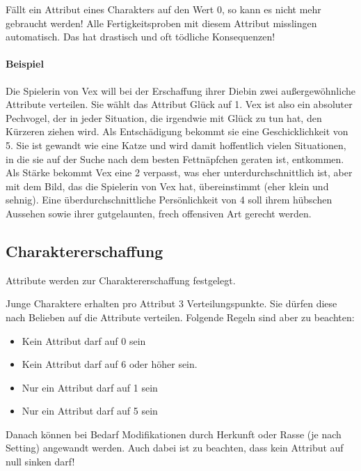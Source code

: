 \documentclass{article}
\begin{document}
Fällt ein Attribut eines Charakters auf den Wert 0, so kann es nicht mehr gebraucht werden! Alle Fertigkeitsproben
mit diesem Attribut misslingen automatisch. Das hat drastisch und oft tödliche Konsequenzen!

\paragraph{Beispiel}

Die Spielerin von Vex will bei der Erschaffung ihrer Diebin zwei außergewöhnliche Attribute verteilen. Sie wählt das
Attribut Glück auf 1. Vex ist also ein absoluter Pechvogel, der in jeder Situation, die irgendwie mit Glück zu tun hat,
den Kürzeren ziehen wird. Als Entschädigung bekommt sie eine Geschicklichkeit von 5. Sie ist gewandt wie eine Katze und
wird damit hoffentlich vielen Situationen, in die sie auf der Suche nach dem besten Fettnäpfchen geraten ist, entkommen.
Als Stärke bekommt Vex eine 2 verpasst, was eher unterdurchschnittlich ist, aber mit dem Bild, das die Spielerin von Vex
hat, übereinstimmt (eher klein und sehnig). Eine überdurchschnittliche Persönlichkeit von 4 soll ihrem hübschen Aussehen
sowie ihrer gutgelaunten, frech offensiven Art gerecht werden.

\begin{center}
\subsection{Charaktererschaffung}
\end{center}

Attribute werden zur Charaktererschaffung festgelegt.

Junge Charaktere erhalten pro Attribut 3 Verteilungspunkte. Sie dürfen diese
nach Belieben auf die Attribute verteilen. Folgende Regeln sind aber zu beachten:

\begin{itemize}
\item Kein Attribut darf auf 0 sein
\item Kein Attribut darf auf 6 oder höher sein.
\item Nur ein Attribut darf auf 1 sein
\item Nur ein Attribut darf auf 5 sein
\end{itemize}

Danach können bei Bedarf Modifikationen durch Herkunft oder Rasse (je nach Setting) angewandt werden. Auch dabei ist zu
beachten, dass kein Attribut auf null sinken darf!
\end{document}
